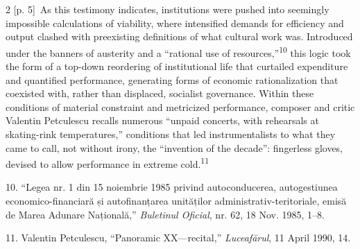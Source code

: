 \documentclass[10pt,a4paper]{article}
\begin{document}
\begin{paracol}{2}
\switchcolumn
{\scriptsize\color{gray} [p. 5]}\ As this testimony indicates, institutions were pushed into seemingly impossible calculations of viability, where intensified demands for efficiency and output clashed with preexisting definitions of what cultural work was. Introduced under the banners of austerity and a “rational use of resources,”\nobreak\textsuperscript{10} this logic took the form of a top-down reordering of institutional life that curtailed expenditure and quantified performance, generating forms of economic rationalization that coexisted with, rather than displaced, socialist governance. Within these conditions of material constraint and metricized performance, composer and critic Valentin Petculescu recalls numerous “unpaid concerts, with rehearsals at skating-rink temperatures,” conditions that led instrumentalists to what they came to call, not without irony, the “invention of the decade”: fingerless gloves, devised to allow performance in extreme cold.\nobreak\textsuperscript{11}\par{\small 10. “Legea nr. 1 din 15 noiembrie 1985 privind autoconducerea, autogestiunea economico-financiară și autofinanțarea unităților administrativ-teritoriale, emisă de Marea Adunare Națională,” \textit{Buletinul Oficial}, nr. 62, 18 Nov. 1985, 1–8.\par}{\small 11. Valentin Petculescu, “Panoramic XX—recital,” \textit{Luceafărul}, 11 April 1990, 14.\par}
\switchcolumn*

\end{paracol}
\end{document}
